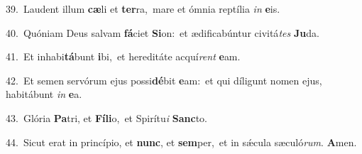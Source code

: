 {\numbfont\textcolor{\numbcolor}{39.}}~Laudent illum \textbf{cæ}\-li et \textbf{ter}\-ra,~\star mare et ómnia reptília \textit{in} \textbf{e}\-is.\par
{\numbfont\textcolor{\numbcolor}{40.}}~Quóniam Deus salvam \textbf{fá}\-ciet \textbf{Si}\-on:~\star et ædificabúntur civitá\textit{tes} \textbf{Ju}\-da.\par
{\numbfont\textcolor{\numbcolor}{41.}}~Et inhabi\-\textbf{tá}\-bunt \textbf{i}\-bi,~\star et hereditáte acquí\textit{rent} \textbf{e}\-am.\par
{\numbfont\textcolor{\numbcolor}{42.}}~Et semen servórum ejus possi\-\textbf{dé}\-bit \textbf{e}\-am:~\star et qui díligunt nomen ejus, habitábunt \textit{in} \textbf{e}\-a.\par
{\numbfont\textcolor{\numbcolor}{43.}}~Glória \textbf{Pa}\-tri, et \textbf{Fí}\-\textbf{li}o,~\star et Spirítu\textit{i} \textbf{Sanc}\-to.\par
{\numbfont\textcolor{\numbcolor}{44.}}~Sicut erat in princípio, et \textbf{nunc}\-, et \textbf{sem}\-per,~\star et in sǽcula sæculó\-\textit{rum}\-. \textbf{A}\-men.\par
